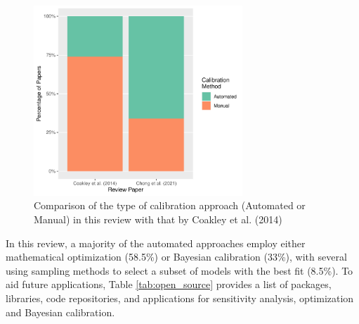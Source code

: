 \documentclass[review]{elsarticle}
\begin{document}
\begin{figure}[!h]
\centering
\includegraphics[width=0.7\textwidth]{figures/auto_manual.pdf}
\caption{Comparison of the type of calibration approach (Automated or Manual) in this review with that by Coakley et al. (2014) \cite{coakley2014review}}
\label{fig:auto_manual}
\end{figure}

In this review, a majority of the automated approaches employ either mathematical optimization (58.5\%) or Bayesian calibration (33\%), with several using sampling methods to select a subset of models with the best fit (8.5\%). To aid future applications, Table \ref{tab:open_source} provides a list of packages, libraries, code repositories, and applications for sensitivity analysis, optimization and Bayesian calibration. 
\end{document}
